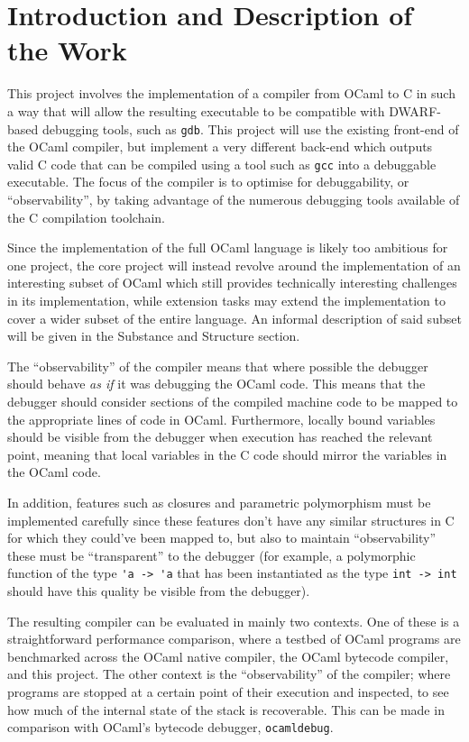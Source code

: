 \section*{Introduction and Description of the Work}

This project involves the implementation of a compiler from OCaml to C in such
a way that will allow the resulting executable to be compatible with
DWARF-based debugging tools, such as \texttt{gdb}. This project will use the
existing front-end of the OCaml compiler, but implement a very different
back-end which outputs valid C code that can be compiled using a tool such as
\texttt{gcc} into a debuggable executable. The focus of the compiler is to
optimise for debuggability, or ``observability'', by taking advantage of the
numerous debugging tools available of the C compilation toolchain.

Since the implementation of the full OCaml language is likely too ambitious for
one project, the core project will instead revolve around the implementation of
an interesting subset of OCaml which still provides technically interesting
challenges in its implementation, while extension tasks may extend the
implementation to cover a wider subset of the entire language. An informal
description of said subset will be given in the Substance and Structure
section.

The ``observability'' of the compiler means that where possible the debugger
should behave \emph{as if} it was debugging the OCaml code. This means that the
debugger should consider sections of the compiled machine code to be mapped to
the appropriate lines of code in OCaml. Furthermore, locally bound variables
should be visible from the debugger when execution has reached the relevant
point, meaning that local variables in the C code should mirror the variables
in the OCaml code.

In addition, features such as closures and parametric polymorphism must be
implemented carefully since these features don't have any similar structures in
C for which they could've been mapped to, but also to maintain
``observability'' these must be ``transparent'' to the debugger (for example, a
polymorphic function of the type \verb!'a -> 'a! that has been instantiated as
the type \verb!int -> int! should have this quality be visible from the
debugger).

The resulting compiler can be evaluated in mainly two contexts. One of these is
a straightforward performance comparison, where a testbed of OCaml programs are
benchmarked across the OCaml native compiler, the OCaml bytecode compiler, and
this project. The other context is the ``observability'' of the compiler; where
programs are stopped at a certain point of their execution and inspected, to
see how much of the internal state of the stack is recoverable. This can be
made in comparison with OCaml's bytecode debugger, \texttt{ocamldebug}.

